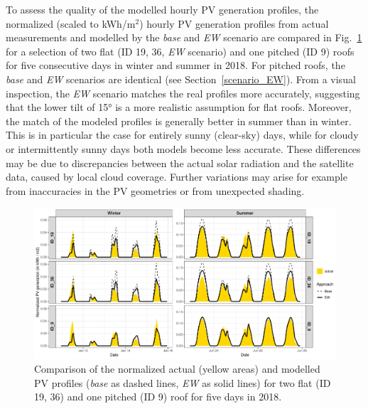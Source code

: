To assess the quality of the modelled hourly PV generation profiles, the normalized (scaled to kWh/m$^2$) hourly PV generation profiles from actual measurements and modelled by the \textit{base} and \textit{EW} scenario are compared in Fig.~\ref{fig:valid_hourly} for a selection of two flat (ID 19, 36, \textit{EW} scenario) and one pitched (ID 9) roofs for five consecutive days in winter and summer in 2018. For pitched roofs, the \textit{base} and \textit{EW} scenarios are identical (see Section~\ref{scenario_EW}). From a visual inspection, the \textit{EW} scenario matches the real profiles more accurately, 
suggesting that the lower tilt of 15° is a more realistic assumption for flat roofs. Moreover, the match of the modeled profiles is generally better in summer than in winter. This is in particular the case for entirely sunny (clear-sky) days, while for cloudy or intermittently sunny days both models become less accurate. These differences may be due to discrepancies between the actual solar radiation and the satellite data, caused by local cloud coverage. Further variations may arise for example from inaccuracies in the PV geometries or from unexpected shading.

\begin{figure}[tb]
\centering\includegraphics[width=0.9\linewidth]{images/Figs/CISBAT_profiles.pdf}
\caption{Comparison of the normalized actual (yellow areas) and modelled PV profiles (\textit{base} as dashed lines, \textit{EW} as solid lines) for two flat (ID 19, 36) and one pitched (ID 9) roof for five days in 2018.}
\label{fig:valid_hourly}
\end{figure}

